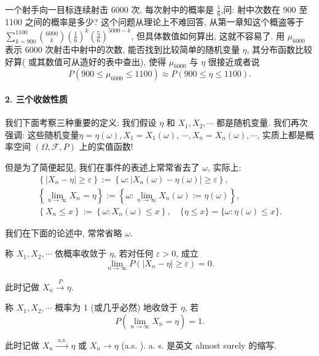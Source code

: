 \begin{example}
    一个射手向一目标连续射击 6000 次, 每次射中的概率是 $\frac{1}{6}$,问: 射中次数在 900 至 1100 之间的概率是多少? 这个问题从理论上不难回答, 从第一章知这个概盗等于 $\sum_{k=900}^{1100} {6000\choose k}\left(\frac{1}{6}\right)^k\left(\frac{5}{6}\right)^{5000-k}$, 但具体数值如何算出, 这就不容易了. 用 $\mu_{6000}$ 表示 6000 次射击中射中的次数, 能否找到比较简单的随机变量 $\eta$, 其分布函数比较好算( 或其数值可从造好的表中查出), 使得 $\mu_{6000}$ 与 $\eta$ 很接近或者说
$$
P\left(900 \leq \mu_{6000} \leq 1100\right) \approx P(900 \leq \eta \leq 1100) .
$$
\end{example}

\paragraph{2. 三个收敛性质} 我们下面考察三种重要的定义: 我们假设 $\eta$ 和 $X_1, X_2, \cdots$ 都是随机变量. 我们再次强调: 这些随机变量$\eta=\eta(\omega), X_1=X_1(\omega)$, $\cdots, X_n=X_n(\omega), \cdots$, 实质上都是概率空间 $(\Omega, \mathscr{F}, P)$ 上的实值函数!

但是为了简便起见, 我们在事件的表述上常常省去了 $\omega$, 实际上:
$$
\begin{gathered}
\left\{\left|X_n-\eta\right| \geq \varepsilon\right\}:=\left\{\omega:\left|X_n(\omega)-\eta(\omega)\right| \geq \varepsilon\right\}, \\
\left\{\lim _{n \rightarrow \infty} X_n=\eta\right\}:=\left\{\omega: \lim _{n \rightarrow \infty} X_n(\omega):=\eta(\omega)\right\}, \\
\left\{X_n \leq x\right\}:=\left\{\omega: X_n(\omega) \leq x\right\}, \quad\{\eta \leq x\}=\{\omega: \eta(\omega) \leq x\} .
\end{gathered}
$$

我们在下面的论述中, 常常省略 $\omega$.

\begin{center}
\end{center}

\begin{definition}
    称 $X_1, X_2, \cdots$ 依概率收敛于 $\eta$, 若对任何 $\varepsilon>0$, 成立
$$
\lim _{n \rightarrow \infty} P\left(\left|X_n-\eta\right| \geq \varepsilon\right)=0 .
$$

此时记做 $X_n \stackrel{P}{\longrightarrow} \eta$.
\end{definition}

\begin{definition}
    称 $X_1, X_2, \cdots$ 概率为 1 (或几乎必然) 地收敛于 $\eta$, 若
$$
P\left(\lim _{n \rightarrow \infty} X_n=\eta\right)=1 .
$$

此时记做 $X_n \stackrel{\text { a.s. }}{\longrightarrow} \eta$ 或 $X_n \rightarrow \eta$ (a.s. ). a. s. 是英文 almost surely 的缩写.
\end{definition}

